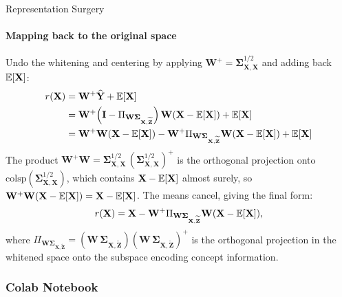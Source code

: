 \begin{question}{Representation Surgery}
\begin{subquestion}
\paragraph{Mapping back to the original space}

Undo the whitening and centering by applying $\mathbf{W}^+ = \boldsymbol{\Sigma}_{\mathbf{X}, \mathbf{X}}^{1/2}$ and adding back $\expectation[\mathbf{X}]$:
\begin{align}
    r(\mathbf{X}) &= \mathbf{W}^+ \widehat{\mathbf{Y}} + \expectation[\mathbf{X}] \\
    &= \mathbf{W}^+\!\left(\mathbf{I} - \Pi_{\mathbf{W}\boldsymbol{\Sigma}_{\mathbf{X}, \widetilde{\mathbf{Z}}}}\right) \mathbf{W}(\mathbf{X} - \expectation[\mathbf{X}]) + \expectation[\mathbf{X}] \\
    &= \mathbf{W}^+ \mathbf{W}(\mathbf{X} - \expectation[\mathbf{X}]) - \mathbf{W}^+ \Pi_{\mathbf{W}\boldsymbol{\Sigma}_{\mathbf{X}, \widetilde{\mathbf{Z}}}} \mathbf{W}(\mathbf{X} - \expectation[\mathbf{X}]) + \expectation[\mathbf{X}]
\end{align}
The product $\mathbf{W}^+ \mathbf{W} = \boldsymbol{\Sigma}_{\mathbf{X}, \mathbf{X}}^{1/2}\, (\boldsymbol{\Sigma}_{\mathbf{X}, \mathbf{X}}^{1/2})^+$ is the orthogonal projection onto $\mathrm{colsp}(\boldsymbol{\Sigma}_{\mathbf{X}, \mathbf{X}}^{1/2})$, which contains $\mathbf{X} - \expectation[\mathbf{X}]$ almost surely, so $\mathbf{W}^+ \mathbf{W}(\mathbf{X} - \expectation[\mathbf{X}]) = \mathbf{X} - \expectation[\mathbf{X}]$. 
The means cancel, giving the final form:
\begin{equation}
    r(\mathbf{X}) = \mathbf{X} - \mathbf{W}^+ \Pi_{\mathbf{W}\boldsymbol{\Sigma}_{\mathbf{X}, \widetilde{\mathbf{Z}}}} \mathbf{W}(\mathbf{X} - \expectation[\mathbf{X}]),
\end{equation}
where $\Pi_{\mathbf{W}\boldsymbol{\Sigma}_{\mathbf{X}, \widetilde{\mathbf{Z}}}} = (\mathbf{W}\, \boldsymbol{\Sigma}_{\mathbf{X}, \widetilde{\mathbf{Z}}})(\mathbf{W}\, \boldsymbol{\Sigma}_{\mathbf{X}, \widetilde{\mathbf{Z}}})^+$ is the orthogonal projection in the whitened space onto the subspace encoding concept information.

\end{subquestion}

\begin{subquestion}

\subsubsection*{Colab Notebook}


\end{subquestion}
\end{question}
